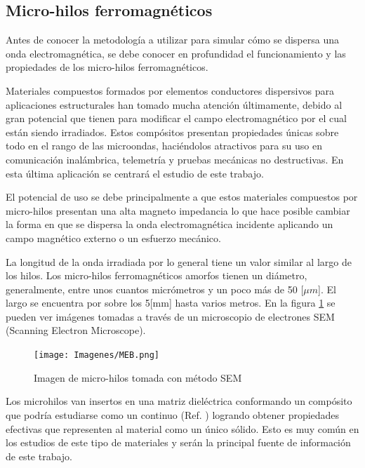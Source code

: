 \documentclass[12pt,letterpaper]{article}
\numberwithin{equation}{section}
\begin{document}
\subsection{Micro-hilos ferromagnéticos} \label{subsec Microhilos ferromagneticos}
Antes de conocer la metodología a utilizar para simular cómo se dispersa una onda electromagnética, se debe conocer en profundidad el funcionamiento y las propiedades de los micro-hilos ferromagnéticos. 

Materiales compuestos formados por elementos conductores dispersivos para aplicaciones estructurales han tomado mucha atención últimamente, debido al gran potencial que tienen para modificar el campo electromagnético por el cual están siendo irradiados. Estos compósitos presentan propiedades únicas sobre todo en el rango de las microondas, haciéndolos atractivos para su uso en comunicación inalámbrica, telemetría y pruebas mecánicas no destructivas. En esta última aplicación se centrará el estudio de este trabajo.

El potencial de uso se debe principalmente a que estos materiales compuestos por micro-hilos presentan una alta magneto impedancia lo que hace posible cambiar la forma en que se dispersa la onda electromagnética incidente aplicando un campo magnético externo o un esfuerzo mecánico. 

La longitud de la onda irradiada por lo general tiene un valor similar al largo de los hilos. Los micro-hilos ferromagnéticos amorfos tienen un diámetro, generalmente, entre unos cuantos micrómetros y un poco más de 50 [$\mu m$]. El largo se encuentra por sobre los 5[mm] hasta varios metros. En la figura \ref{fig:SEM} se pueden ver imágenes tomadas a través de un microscopio de electrones SEM (Scanning Electron Microscope).

\begin{figure}[H]
	\centering\texttt{[image: Imagenes/MEB.png]}\\
	\caption{Imagen de micro-hilos tomada con método SEM}
	\label{fig:SEM}
\end{figure} 

Los microhilos van insertos en una matriz dieléctrica conformando un compósito que podría estudiarse como un continuo (Ref. \cite{Wire_theory_1,Wire_theory_2}) logrando obtener propiedades efectivas que representen al material como un único sólido. Esto es muy común en los estudios de este tipo de materiales \cite{Wire_theory_1, Wire_theory_2,Wire_backgound,Wire_permeability} y serán la principal fuente de información de este trabajo.
\end{document}
